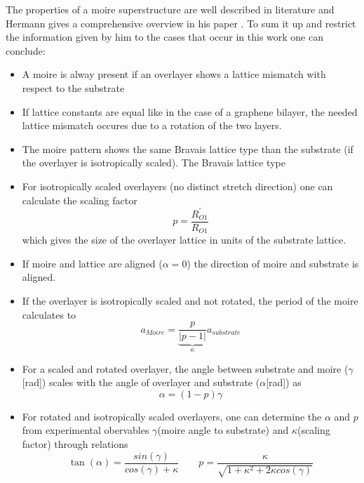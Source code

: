 The properties of a moire superstructure are well described in literature and Hermann gives a comprehensive overview in his paper \cite{hermann_periodic_2012}. To sum it up and restrict the information given by him to the cases that occur in this work one can conclude:
\begin{itemize}
 \item A moire is alway present if an overlayer shows a lattice mismatch with respect to the substrate
 \item If lattice constants are equal like in the case of a graphene bilayer, the needed lattice mismatch occures due to a rotation of the two layers.
 \item The moire pattern shows the same Bravais lattice type than the substrate\cite[10]{hermann_periodic_2012} (if the overlayer is isotropically scaled). The Bravais lattice type 
 \item For isotropically scaled overlayers (no distinct stretch direction) one can calculate the scaling factor $$p=\frac{R^{'}_{O1}}{R_{O1}}$$ which gives the size of the overlayer lattice in units of the substrate lattice. 
 \item If moire and lattice are aligned ($\alpha=0$\textdegree) the direction of moire and substrate is aligned.
 \item If the overlayer is isotropically scaled and not rotated, the period of the moire calculates to $$a_{Moire}=\underbrace{\frac{p}{|p-1|}}_{\kappa}a_{substrate}$$
 \item For a scaled and rotated overlayer, the angle between substrate and moire ($\gamma$[rad]) scales with the angle of overlayer and substrate ($\alpha$[rad]) as $$\alpha=(1-p)\gamma$$
 \item For rotated and isotropically scaled overlayers, one can determine the $\alpha$ and $p$ from experimental obervables $\gamma$(moire angle to substrate) and $\kappa$(scaling factor) through relations $$ \tan(\alpha)=\frac{sin(\gamma)}{cos(\gamma)+\kappa}\qquad p=\frac{\kappa}{\sqrt{1+\kappa^2+2\kappa cos(\gamma)}}$$
\end{itemize}


